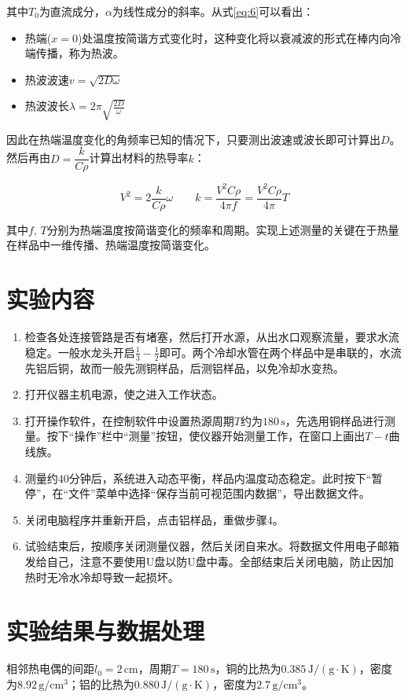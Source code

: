 \documentclass[12pt]{article}
\begin{document}
其中$ T_0 $为直流成分，$ \alpha $为线性成分的斜率。从式\ref{eq:6}可以看出：

\begin{itemize}
    \item 热端($x=0$)处温度按简谐方式变化时，这种变化将以衰减波的形式在棒内向冷端传播，称为热波。
    \item 热波波速$ v=\sqrt{2D\omega}$
    \item 热波波长$ \lambda=2\pi\sqrt{\frac{2D}{\omega}} $
\end{itemize}

因此在热端温度变化的角频率已知的情况下，只要测出波速或波长即可计算出$D$。然后再由$D=\dfrac{k}{C\rho}$计算出材料的热导率$k$：

\begin{equation}
    V^2=2\frac{k}{C\rho}\omega \qquad k=\frac{V^2C\rho}{4\pi f}=\frac{V^2C\rho}{4\pi}T
\end{equation}

其中$ f,\,T $分别为热端温度按简谐变化的频率和周期。实现上述测量的关键在于热量在样品中一维传播、热端温度按简谐变化。

\section{实验内容}
\begin{enumerate}
    \item 检查各处连接管路是否有堵塞，然后打开水源，从出水口观察流量，要求水流稳定。一般水龙头开启$\frac{1}{3}-\frac{1}{2}$即可。两个冷却水管在两个样品中是串联的，水流先铝后铜，故而一般先测铜样品，后测铝样品，以免冷却水变热。
    \item 打开仪器主机电源，使之进入工作状态。
    \item 打开操作软件，在控制软件中设置热源周期$T$约为$180\,\mathrm s $，先选用铜样品进行测量。按下“操作”栏中“测量”按钮，使仪器开始测量工作，在窗口上画出$ T-t $曲线族。
    \item 测量约40分钟后，系统进入动态平衡，样品内温度动态稳定。此时按下“暂停”，在“文件”菜单中选择“保存当前可视范围内数据”，导出数据文件。
    \item 关闭电脑程序并重新开启，点击铝样品，重做步骤4。
    \item 试验结束后，按顺序关闭测量仪器，然后关闭自来水。将数据文件用电子邮箱发给自己，注意不要使用U盘以防U盘中毒。全部结束后关闭电脑，防止因加热时无冷水冷却导致一起损坏。
\end{enumerate}

\section{实验结果与数据处理}
相邻热电偶的间距$ l_0=2\,\mathrm{cm} $，周期$ T=180\,\mathrm{s} $，铜的比热为$ 0.385\,\mathrm{J/(g\cdot K)} $，密度为$ 8.92\,\mathrm{g/cm^3} $；铝的比热为$ 0.880\,\mathrm{J/(g\cdot K)} $，密度为$ 2.7\,\mathrm{g/cm^3} $。
\end{document}
